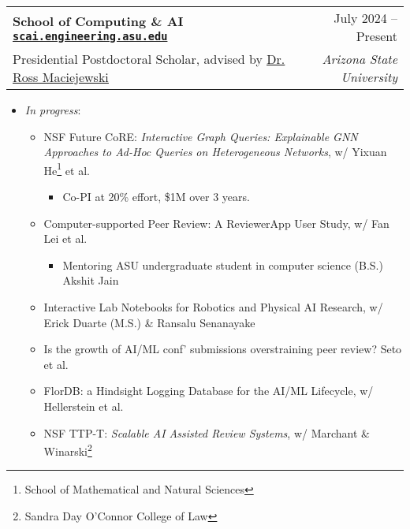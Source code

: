 \documentclass[letterpaper,11pt]{article}
\makeatletter
\newcommand{\resumeItem}[1]{
  \item\small{
    {#1 \vspace{-2pt}}
  }
}
\newcommand{\resumeSubheading}[4]{
  \vspace{-2pt}\item
    \begin{tabular*}{0.97\textwidth}[t]{l@{\extracolsep{\fill}}r}
      \textbf{#1} & #2 \\
      \small#3 & \textit{\small #4} \\
    \end{tabular*}\vspace{-7pt}
}
\newcommand{\resumeItemListStart}{\begin{itemize}}
\newcommand{\resumeItemListEnd}{\end{itemize}\vspace{-5pt}}
\makeatother
\begin{document}
\resumeSubheading
{School of Computing \& AI
  \href{https://scai.engineering.asu.edu/}
  {\texttt{{scai.engineering.asu.edu}}}
}{July 2024 -- Present}
{Presidential Postdoctoral Scholar, advised by \href{http://rmaciejewski.faculty.asu.edu/}{\underline{Dr. Ross Maciejewski}}}{Arizona State University}
\begin{itemize}
  \item \emph{In progress}:
  \begin{itemize}
    \item NSF Future CoRE: \textit{Interactive Graph Queries: Explainable GNN Approaches to Ad-Hoc Queries on Heterogeneous Networks}, w/ Yixuan He\footnote{School of Mathematical and Natural Sciences} et al.
    \begin{itemize}
      \item Co-PI at 20\% effort, \$1M over 3 years.
    \end{itemize}
    \item Computer-supported Peer Review: A ReviewerApp User Study, w/ Fan Lei et al.
    \begin{itemize}
      \item Mentoring ASU undergraduate student in computer science (B.S.) Akshit Jain 
    \end{itemize}
    \item Interactive Lab Notebooks for Robotics and Physical AI Research, w/ Erick Duarte (M.S.) \& Ransalu Senanayake
    \item Is the growth of AI/ML conf' submissions overstraining peer review? Seto et al.
    \item FlorDB: a Hindsight Logging Database for the AI/ML Lifecycle, w/ Hellerstein et al.
    \item NSF TTP-T: \textit{Scalable AI Assisted Review Systems}, w/ Marchant \& Winarski\footnote{Sandra Day O'Connor College of Law}
  \end{itemize}
\end{itemize}
\end{document}
